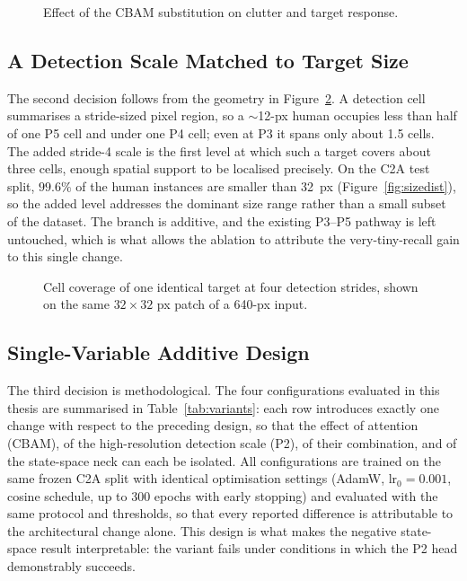 \begin{figure}[tbp]
  \centering
  \caption{Effect of the CBAM substitution on clutter and target response.}
  \label{fig:cbameffect}
\end{figure}

\subsection{A Detection Scale Matched to Target Size}
\label{sec:p2novel}
The second decision follows from the geometry in Figure~\ref{fig:strideprob}. A
detection cell summarises a stride-sized pixel region, so a $\sim$12-px human
occupies less than half of one P5 cell and under one P4 cell; even at P3 it spans
only about 1.5 cells. The added stride-4 scale is the first level at which such a
target covers about three cells, enough spatial support to be localised
precisely. On the C2A test split, $99.6\%$ of the human instances are smaller
than 32~px (Figure~\ref{fig:sizedist}), so the added level addresses the
dominant size range rather than a small subset of the dataset. The
branch is additive, and the existing P3--P5 pathway is left untouched, which is
what allows the ablation to attribute the very-tiny-recall gain to this single
change.

\begin{figure}[tbp]
  \centering
  \caption[Cell coverage of one target at four detection strides.]{Cell coverage
  of one identical target at four detection strides, shown on the same
  $32 \times 32$ px patch of a 640-px input.}
  \label{fig:strideprob}
\end{figure}

\subsection{Single-Variable Additive Design}
The third decision is methodological. The four configurations evaluated in this
thesis are summarised in Table~\ref{tab:variants}: each row introduces exactly
one change with respect to the preceding design, so that the effect of attention
(CBAM), of the high-resolution detection scale (P2), of their combination, and
of the state-space neck can each be isolated. All configurations are trained on
the same frozen C2A split with identical optimisation settings (AdamW,
$\text{lr}_0 = 0.001$, cosine schedule, up to 300 epochs with early stopping)
and evaluated with the same protocol and thresholds, so that every reported
difference is attributable to the architectural change alone. This design is
what makes the negative state-space result interpretable: the variant fails
under conditions in which the P2 head demonstrably succeeds.

